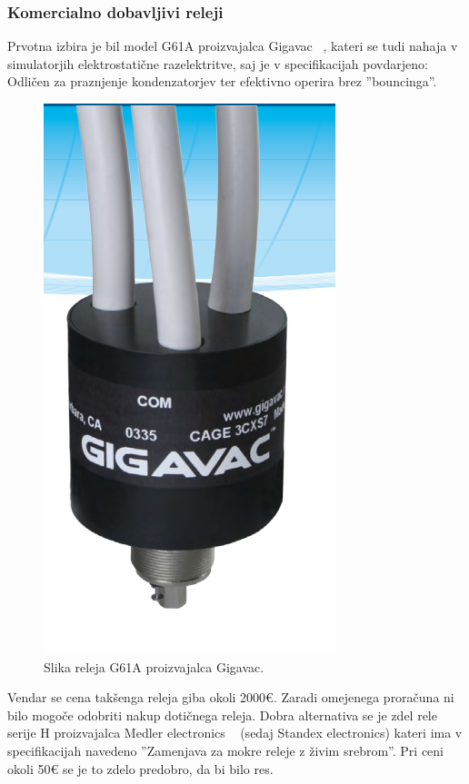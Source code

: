 \documentclass[a4paper,twoside,openright,12pt,slovene]{book}
\begin{document}
	\subsubsection{Komercialno dobavljivi releji} \label{Komercialno dobavljivi releji}
     Prvotna izbira je bil model G61A proizvajalca Gigavac ~\cite{Gigavac:G61A}, kateri se tudi nahaja v simulatorjih elektrostatične razelektritve, saj je v specifikacijah povdarjeno: Odličen za praznjenje kondenzatorjev ter efektivno operira brez ''bouncinga''.
    
    \begin{figure}[H]
        \centering
        \includegraphics[width=0.5\columnwidth]{Slike/GigavacG61C.png}
        \caption{\label{GigavacG61C} Slika releja G61A proizvajalca Gigavac.}
    \end{figure}    
    
    Vendar se cena takšenga releja giba okoli 2000\euro{}. Zaradi omejenega proračuna ni bilo mogoče odobriti nakup dotičnega releja. Dobra alternativa se je zdel rele serije H proizvajalca Medler electronics ~\cite{Standex:H} (sedaj Standex electronics) kateri ima v specifikacijah navedeno ''Zamenjava za mokre releje z živim srebrom''. Pri ceni okoli 50\euro{} se je to zdelo predobro, da bi bilo res.
    
\end{document}
